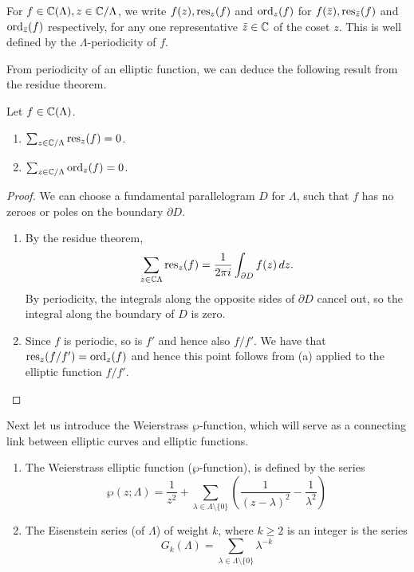 \begin{notation}
	For $f \in \mathbb{C}(\Lambda), z \in \mathbb{C}/\Lambda$, we write $f(z), \operatorname{res}_z(f)$ and $\operatorname{ord}_z(f)$ for
	$f(\bar{z}), \operatorname{res}_{\bar{z}}(f)$ and $\operatorname{ord}_{\bar{z}}(f)$ respectively,
	for any one representative
	$\bar{z} \in \mathbb{C}$ of the coset $z$. This is well defined by the
	$\Lambda$-periodicity of $f$.
\end{notation}

From periodicity of an elliptic function, we can deduce the following result
from the residue theorem.

\begin{proposition}
	\label{prop:residue}
	Let $f \in \mathbb{C}(\Lambda)$.
	\begin{enumerate}[label=(\alph*)]
		\item $\sum_{z \in \mathbb{C}/\Lambda} \operatorname{res}_z(f) = 0$.
		\item $\sum_{z \in \mathbb{C}/\Lambda} \operatorname{ord}_z(f) = 0$.
	\end{enumerate}
\end{proposition}

\begin{proof}
	We can choose a fundamental parallelogram $D$ for $\Lambda$,
	such that $f$ has no zeroes or poles on the boundary $\partial D$.
	\begin{enumerate}[label=(\alph*)]
		\item By the residue theorem,
			\begin{equation*}
				\sum_{z \in \mathbb{C}\Lambda} \operatorname{res}_z(f)
				= \frac{1}{2\pi i}\int_{\partial D}f(z)\,dz.
			\end{equation*}
			By periodicity, the integrals along the opposite sides of $\partial D$
			cancel out, so the integral along the boundary of $D$ is zero.
		\item Since $f$ is periodic, so is $f'$ and hence also
			$f/f'$. We have that $\operatorname{res}_z(f/f') = \operatorname{ord}_z(f)$ and hence 
			this point follows from (a) applied to the elliptic function
			$f/f'$.
	\end{enumerate}
\end{proof}

Next let us introduce the Weierstrass $\wp$-function, which will serve
as a connecting link between elliptic curves and elliptic functions.

\begin{definition}
	\begin{enumerate}[label=(\alph*)]
		\item
			The Weierstrass
			elliptic function ($\wp$-function),
			is defined by the series
			\begin{equation*}
				\wp(z; \Lambda) = \frac{1}{z^2}
				+ \sum_{\lambda \in \Lambda\setminus\{0\}}
				\left(
					\frac{1}{(z-\lambda)^2} - \frac{1}{\lambda^2}
				\right)
			\end{equation*}
		\item
			The Eisenstein series (of $\Lambda$) of weight $k$,
			where $k \geq 2$ is an integer
			is the series
			\begin{equation*}
				G_k(\Lambda) = \sum_{\lambda \in \Lambda\setminus\{0\}}
				\lambda^{-k}
			\end{equation*}
	\end{enumerate}
\end{definition}

